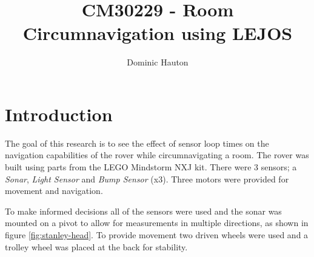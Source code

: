 \documentclass[a4paper,12pt,twocolumn]{report}
\title{CM30229 - Room Circumnavigation using LEJOS}
\author{Dominic Hauton}
\begin{document}
\maketitle

\begin{abstract}
\end{abstract}

\section{Introduction}



The goal of this research is to see the effect of sensor loop times on the navigation capabilities of the rover while circumnavigating a room. The rover was built using parts from the LEGO Mindstorm NXJ kit. There were 3 sensors; a \emph{Sonar}, \emph{Light Sensor} and \emph{Bump Sensor} (x3). Three motors were provided for movement and navigation.

To make informed decisions all of the sensors were used and the sonar was mounted on a pivot to allow for measurements in multiple directions, as shown in figure \ref{fig:stanley-head}. To provide movement two driven wheels were used and a trolley wheel was placed at the back for stability.
\end{document}
